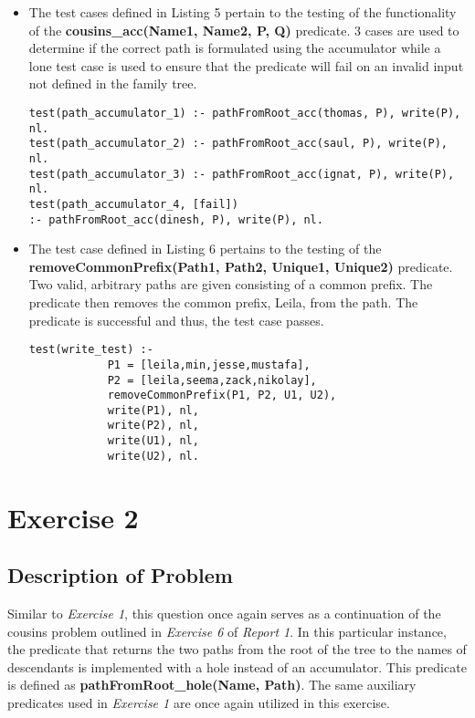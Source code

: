 \documentclass[11pt]{article}
\newcommand{\forceindent}{\leavevmode{\parindent=1em\indent}}
\begin{document}
\begin{itemize}
\item 
The test cases defined in Listing 5 pertain to the testing of the functionality of the \textbf{cousins\_acc(Name1, Name2, P, Q)} predicate. 3 cases are used to determine if the correct path is formulated using the accumulator while a lone test case is used to ensure that the predicate will fail on an invalid input not defined in the family tree.
\begin{lstlisting}[caption= Functionality of Accumulator, label= Listing 5]
test(path_accumulator_1) :- pathFromRoot_acc(thomas, P), write(P), nl.
test(path_accumulator_2) :- pathFromRoot_acc(saul, P), write(P), nl.
test(path_accumulator_3) :- pathFromRoot_acc(ignat, P), write(P), nl.
test(path_accumulator_4, [fail]) 
:- pathFromRoot_acc(dinesh, P), write(P), nl.
\end{lstlisting}


\item
The test case defined in Listing 6 pertains to the testing of the \textbf{removeCommonPrefix(Path1, Path2, Unique1, Unique2)} predicate. Two valid, arbitrary paths are given consisting of a common prefix. The predicate then removes the common prefix, Leila, from the path. The predicate is successful and thus, the test case passes.

\begin{lstlisting}[caption= Correct Paths \& Common Prefix Removed, label= Listing 6]
test(write_test) :- 
            P1 = [leila,min,jesse,mustafa],
            P2 = [leila,seema,zack,nikolay],
            removeCommonPrefix(P1, P2, U1, U2), 
            write(P1), nl,
            write(P2), nl, 
            write(U1), nl,
            write(U2), nl.
\end{lstlisting}

\end{itemize} 	

\section{Exercise 2}
	\subsection{Description of Problem}
\forceindent Similar to \emph{Exercise 1}, this question once again serves as a continuation of the cousins problem outlined in \emph{Exercise 6} of \emph{Report 1}. In this particular instance, the predicate that returns the two paths from the root of the tree to the names of descendants is implemented with a hole instead of an accumulator. This predicate is defined as \textbf{pathFromRoot\_hole(Name, Path)}. The same auxiliary predicates used in \emph{Exercise 1} are once again utilized in this exercise. 	
\end{document}

